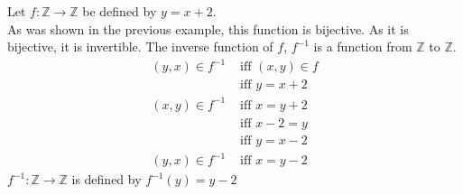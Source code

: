 \documentclass[\main/notes.tex]{subfiles}
\begin{document}
				\begin{example}
					Let $f: \mathbb{Z} \rightarrow \mathbb{Z}$ be defined by $y = x + 2$.\\
					As was shown in the previous example, this function is bijective. As it is bijective, it is invertible. The inverse function of $f$, $f^{-1}$ is a function from $\mathbb{Z}$ to $\mathbb{Z}$.
					\begin{align*}
						(y, x) \in f^{-1} &\text{ iff } (x, y) \in f\\
						& \text{ iff } y = x + 2\\
						(x, y) \in f^{-1} &\text{ iff } x = y + 2 \tag*{(swap variables)}\\
						&\text{ iff } x - 2 = y \tag*{(solve for $y$)}\\
						&\text{ iff } y = x - 2\\
						(y, x) \in f^{-1} & \text{ iff } x = y - 2 \tag*{(swap variables back)}
					\end{align*}
					$f^{-1}: \mathbb{Z} \rightarrow \mathbb{Z}$ is defined by $f^{-1}(y) = y - 2$
				\end{example}
\end{document}
